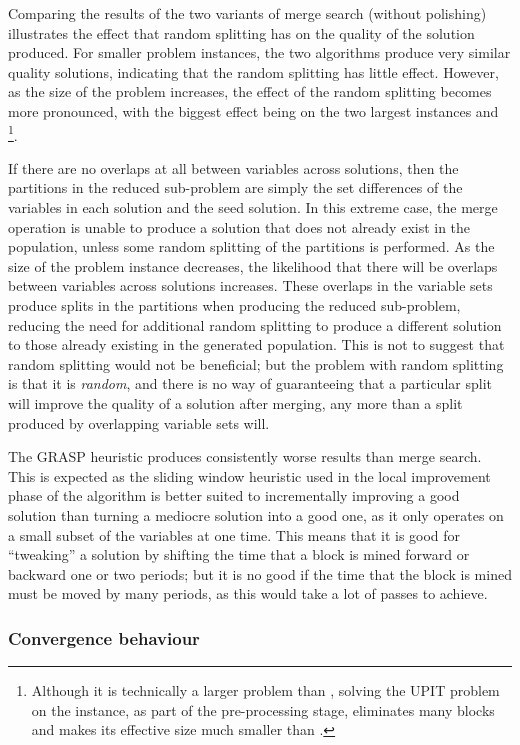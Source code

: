 \documentclass[preprint]{elsarticle}
\begin{document}
Comparing the results of the two variants of merge search (without polishing) illustrates the effect that random splitting has on the quality of the solution produced. For smaller problem instances, the two algorithms produce very similar quality solutions, indicating that the random splitting has little effect. However, as the size of the problem increases, the effect of the random splitting becomes more pronounced, with the biggest effect being on the two largest instances \zuckmed{} and \zucklarge{}\footnote{Although it is technically a larger problem than \zuckmed, solving the UPIT problem on the \marvin{} instance, as part of the pre-processing stage, eliminates many blocks and makes its effective size much smaller than \zuckmed.}. 

If there are no overlaps at all between variables across solutions, then the partitions in the reduced sub-problem are simply the set differences of the variables in each solution and the seed solution. In this extreme case, the merge operation is unable to produce a solution that does not already exist in the population, unless some random splitting of the partitions is performed. As the size of the problem instance decreases, the likelihood that there will be overlaps between variables across solutions increases. These overlaps in the variable sets produce splits in the partitions when producing the reduced sub-problem, reducing the need for additional random splitting to produce a different solution to those already existing in the generated population. This is not to suggest that random splitting would not be beneficial; but the problem with random splitting is that it is \emph{random}, and there is no way of guaranteeing that a particular split will improve the quality of a solution after merging, any more than a split produced by overlapping variable sets will.

The GRASP heuristic produces consistently worse results than merge search. This is expected as the sliding window heuristic used in the local improvement phase of the algorithm is better suited to incrementally improving a good solution than turning a mediocre solution into a good one, as it only operates on a small subset of the variables at one time. This means that it is good for ``tweaking'' a solution by shifting the time that a block is mined forward or backward one or two periods; but it is no good if the time that the block is mined must be moved by many periods, as this would take a lot of passes to achieve.

\subsubsection*{\textbf{Convergence behaviour}}
\end{document}
